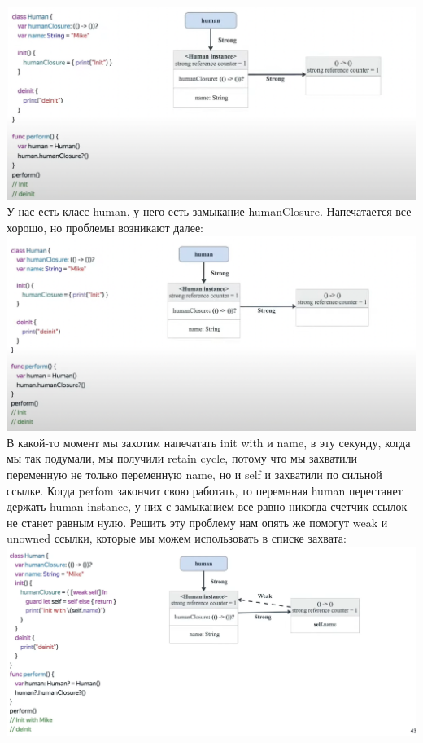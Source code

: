 \documentclass{article}
\begin{document}
    \newline
    \includegraphics[scale = 0.5]{pic/Снимок экрана 2023-07-27 в 23.33.24.png}
    \newline
    У нас есть класс human, у него есть замыкание humanClosure. Напечатается все хорошо, но проблемы возникают далее: 
    \newline
    \includegraphics[scale = 0.5]{pic/Снимок экрана 2023-07-27 в 23.35.12.png}
    \newline
    В какой-то момент мы захотим напечатать init with и name, в эту секунду, когда мы так подумали, мы получили retain cycle, потому что мы захватили переменную не только переменную name, но и self и захватили по сильной ссылке. 
    \newline
    Когда perfom закончит свою работать, то перемнная human перестанет держать human instance, у них с замыканием все равно никогда счетчик ссылок не станет равным нулю. 
    \newline
    Решить эту проблему нам опять же помогут weak и unowned ссылки, которые мы можем использовать в списке захвата: 
    \newline
    \includegraphics[scale = 0.3]{pic/Снимок экрана 2023-07-27 в 23.39.08.png}
\end{document}
